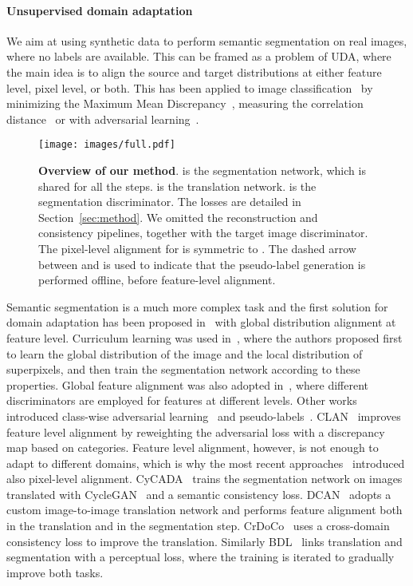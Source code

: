 \documentclass{bmvc2k}
\begin{document}
\paragraph{Unsupervised domain adaptation}
We aim at using synthetic data to perform semantic segmentation on real images, where no labels are available. This can be framed as a problem of UDA, where the main idea is to align the source and target distributions at either feature level, pixel level, or both. This has been applied to image classification~\cite{ganin2015unsupervised, tzeng2015simultaneous, learning_transferable, ganin2016domain, long2016unsupervised, adda, raan} by minimizing the Maximum Mean Discrepancy~\cite{daml, learning_transferable}, measuring the correlation distance~\cite{coral} or with adversarial learning~\cite{adda}.

\begin{figure}
	\centering
	\texttt{[image: images/full.pdf]}
	\caption{\textbf{Overview of our method}.  is the segmentation network, which is shared for all the steps.  is the translation network.  is the segmentation discriminator. The losses are detailed in Section~\ref{sec:method}. We omitted the reconstruction and consistency pipelines, together with the target image discriminator. The pixel-level alignment for  is symmetric to . The dashed arrow between  and  is used to indicate that the pseudo-label generation is performed offline, before feature-level alignment.}
	\label{fig:full_scheme}
\end{figure}

Semantic segmentation is a much more complex task and the first solution for domain adaptation has been proposed in~\cite{fcnsitw} with global distribution alignment at feature level. Curriculum learning was used in~\cite{cda}, where the authors proposed first to learn the global distribution of the image and the local distribution of superpixels, and then train the segmentation network according to these properties. Global feature alignment was also adopted in~\cite{adaptsegnet}, where different discriminators are employed for features at different levels. Other works introduced class-wise adversarial learning~\cite{nomoredis} and pseudo-labels~\cite{nomoredis, cbst, bdl}. CLAN~\cite{clan} improves feature level alignment by reweighting the adversarial loss with a discrepancy map based on categories. Feature level alignment, however, is not enough to adapt to different domains, which is why the most recent approaches~\cite{domstylization, cycada, dcan, crdoco, bdl} introduced also pixel-level alignment. CyCADA~\cite{cycada} trains the segmentation network on images translated with CycleGAN~\cite{cyclegan} and a semantic consistency loss. DCAN~\cite{dcan} adopts a custom image-to-image translation network and performs feature alignment both in the translation and in the segmentation step. CrDoCo~\cite{crdoco} uses a cross-domain consistency loss to improve the translation. Similarly BDL~\cite{bdl} links translation and segmentation with a perceptual loss, where the training is iterated to gradually improve both tasks.
\end{document}
